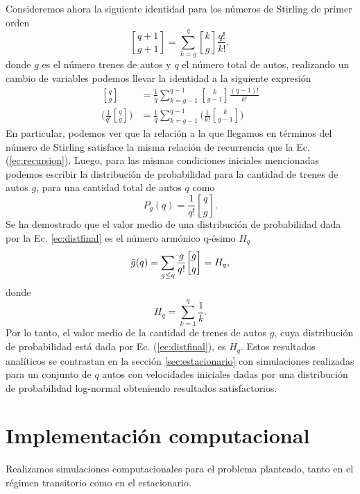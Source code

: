 \documentclass[letterpaper,12pt]{article}
\theoremstyle{plain}
\newcommand{\stirlingI}[2]{\genfrac{[}{]}{0pt}{}{#1}{#2}}
\begin{document}
Consideremos ahora la siguiente identidad para los números de Stirling de primer orden 
\begin{equation}
    \stirlingI{q+1}{g+1} = \sum_{k=g}^{q} \stirlingI{k}{g} \frac{q!}{k!},
\end{equation}
donde $g$ es el número trenes de autos y $q$ el número total de autos, realizando un cambio de variables podemos llevar la identidad a la siguiente expresión 
\begin{align}
    \stirlingI{q}{g} &= \frac{1}{q} \sum_{k=g-1}^{q-1} \stirlingI{k}{g-1} \frac{(q-1)!}{k!} \\
    \biggr( \frac{1}{q!} \stirlingI{q}{g} \biggr) &= \frac{1}{q} \sum_{k=g-1}^{q-1} \biggr(  \frac{1}{k!} \stirlingI{k}{g-1} \biggr)
    \label{ec:stirling}
\end{align}
En particular, podemos ver que la relación a la que llegamos en términos del número de Stirling satisface la misma relación de recurrencia que la Ec. (\ref{ec:recursion}). Luego, para las mismas condiciones iniciales mencionadas podemos escribir la distribución de probabilidad para la cantidad de trenes de autos $g$, para una cantidad total de autos $q$ como
\begin{equation}
    P_g(q) = \frac{1}{q!} \stirlingI{q}{g}.
    \label{ec:distfinal}
\end{equation}
Se ha demostrado \cite{benjamin_stirling_2002} que el valor medio de una distribución de probabilidad dada por la Ec. \ref{ec:distfinal} es el número armónico q-ésimo $H_q$
\begin{equation}
    \Bar{g}(q) = \sum_{g \leq q} \frac{g}{q!} \stirlingI{g}{q} = H_q,
    \label{ec:valormedio}
\end{equation}
donde 
\begin{equation}
    H_q = \sum_{k=1}^q \frac{1}{k}.
\end{equation}
Por lo tanto, el valor medio de la cantidad de trenes de autos $g$, cuya distribución de probabilidad está dada por Ec. (\ref{ec:distfinal}), es $H_q$. Estos resultados analíticos se contrastan en la sección \ref{sec:estacionario} con simulaciones realizadas para un conjunto de $q$ autos con velocidades iniciales dadas por una distribución de probabilidad log-normal obteniendo resultados satisfactorios.

\section{Implementación computacional}

Realizamos simulaciones computacionales para el problema planteado, tanto en el régimen transitorio como en el estacionario.
\end{document}
